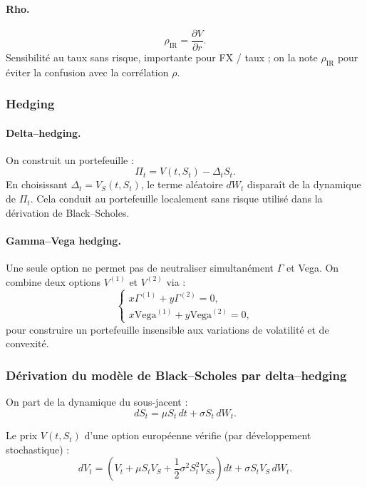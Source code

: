 \documentclass[11pt,a4paper]{article}
\newcommand{\1}{\mathbf{1}}
\begin{document}
\paragraph{Rho.}
\[
\rho_{\mathrm{IR}} = \frac{\partial V}{\partial r}.
\]
Sensibilité au taux sans risque, importante pour FX / taux ; on la note $\rho_{\mathrm{IR}}$ pour éviter la confusion avec la corrélation $\rho$.

\subsubsection{Hedging}

\paragraph{Delta--hedging.}

On construit un portefeuille :
\[
\Pi_t = V(t,S_t) - \Delta_t S_t.
\]
En choisissant $\Delta_t = V_S(t,S_t)$, le terme aléatoire $dW_t$ disparaît de
la dynamique de $\Pi_t$.
Cela conduit au portefeuille localement sans risque utilisé dans la dérivation
de Black--Scholes.

\paragraph{Gamma--Vega hedging.}

Une seule option ne permet pas de neutraliser simultanément $\Gamma$ et Vega.
On combine deux options $V^{(1)}$ et $V^{(2)}$ via :
\[
\begin{cases}
x \Gamma^{(1)} + y \Gamma^{(2)} = 0, \\
x \text{Vega}^{(1)} + y \text{Vega}^{(2)} = 0,
\end{cases}
\]
pour construire un portefeuille insensible aux variations de volatilité et de
convexité.

\subsubsection{D\'erivation du mod\`ele de Black--Scholes par delta--hedging}

On part de la dynamique du sous-jacent :
\[
dS_t = \mu S_t\, dt + \sigma S_t\, dW_t.
\]

Le prix $V(t,S_t)$ d'une option européenne vérifie (par développement stochastique) :
\[
dV_t
=
\left(
V_t
+ \mu S_t V_S
+ \frac12 \sigma^2 S_t^2 V_{SS}
\right) dt
+ \sigma S_t V_S\, dW_t.
\]
\end{document}
